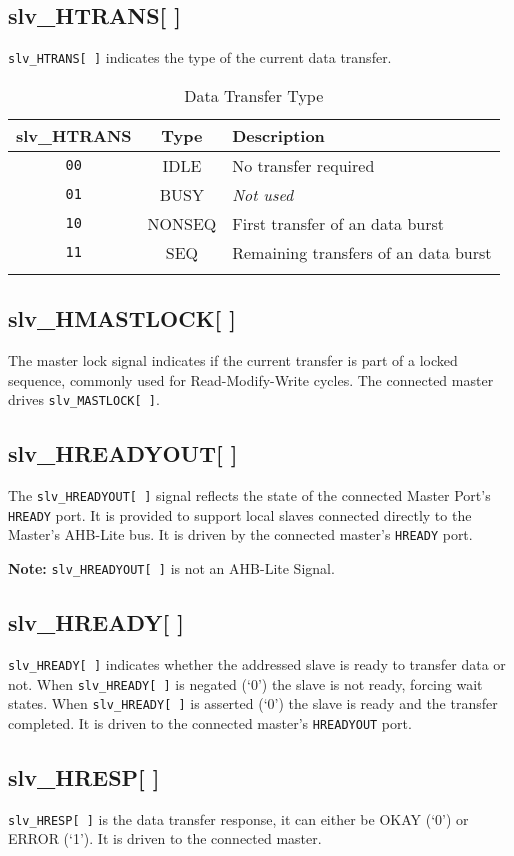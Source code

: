 \subsection{slv\_HTRANS[ ]}\label{slv_htrans}

\texttt{slv\_HTRANS[\,]} indicates the type of the current data transfer.

\begin{longtable}[]{@{}ccl@{}}
\toprule
slv\_HTRANS & Type & Description\tabularnewline
\midrule
\endhead
\texttt{00} & IDLE & No transfer required\tabularnewline
\texttt{01} & BUSY & \emph{Not used}\tabularnewline
\texttt{10} & NONSEQ & First transfer of an data burst\tabularnewline
\texttt{11} & SEQ & Remaining transfers of an data burst\tabularnewline
\bottomrule
\caption{Data Transfer Type}
\end{longtable}

\subsection{slv\_HMASTLOCK[ ]}\label{slv_hmastlock}

The master lock signal indicates if the current transfer is part of a
locked sequence, commonly used for Read-Modify-Write cycles. The
connected master drives \texttt{slv\_MASTLOCK[\,]}.

\subsection{slv\_HREADYOUT[ ]}\label{slv_hreadyout}

The \texttt{slv\_HREADYOUT[\,]} signal reflects the state of the connected Master
Port's \texttt{HREADY} port. It is provided to support local slaves connected
directly to the Master's AHB-Lite bus. It is driven by the connected
master's \texttt{HREADY} port.

\textbf{Note:} \texttt{slv\_HREADYOUT[\,]} is not an AHB-Lite Signal.

\subsection{slv\_HREADY[ ]}\label{slv_hready}

\texttt{slv\_HREADY[\,]} indicates whether the addressed slave is ready to transfer
data or not. When \texttt{slv\_HREADY[\,]} is negated (`0') the slave is not ready,
forcing wait states. When \texttt{slv\_HREADY[\,]} is asserted (`0') the slave is
ready and the transfer completed. It is driven to the connected master's
\texttt{HREADYOUT} port.

\subsection{slv\_HRESP[ ]}\label{slv_hresp}

\texttt{slv\_HRESP[\,]} is the data transfer response, it can either be OKAY (`0') or
ERROR (`1'). It is driven to the connected master.
